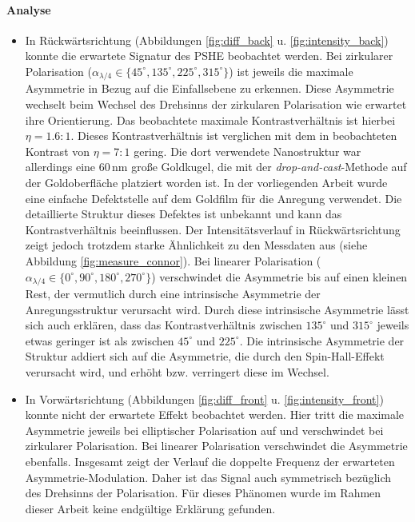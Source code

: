 \documentclass[a4paper, titlepage,  ngerman]{book}
\begin{document}
		\paragraph{Analyse}
		\begin{itemize}
			\item In Rückwärtsrichtung (Abbildungen \ref{fig:diff_back} u. \ref{fig:intensity_back}) konnte die erwartete Signatur des PSHE beobachtet werden. Bei zirkularer Polarisation ($\alpha_{\lambda/4} \in \{45^\circ, 135^\circ, 225^\circ, 315^\circ\}$) ist jeweils die maximale Asymmetrie in Bezug auf die Einfallsebene zu erkennen. Diese Asymmetrie wechselt beim Wechsel des Drehsinns der zirkularen Polarisation wie erwartet ihre Orientierung. Das beobachtete maximale Kontrastverhältnis ist hierbei $\eta = 1.6:1$. Dieses Kontrastverhältnis ist verglichen mit dem in \cite{OConnor.2014} beobachteten Kontrast von $\eta =7:1$ gering.  Die dort verwendete Nanostruktur war allerdings eine  $60\,\mathrm{nm}$ große Goldkugel, die mit der \textit{drop-and-cast}-Methode auf der Goldoberfläche platziert worden ist. In der vorliegenden Arbeit wurde eine einfache Defektstelle auf dem Goldfilm für die Anregung verwendet. Die detaillierte Struktur dieses Defektes ist unbekannt und kann das Kontrastverhältnis beeinflussen. Der Intensitätsverlauf in Rückwärtsrichtung zeigt jedoch trotzdem starke Ähnlichkeit zu den Messdaten aus \cite{OConnor.2014} (siehe Abbildung \ref{fig:measure_connor}). Bei linearer Polarisation ($\alpha_{\lambda/4} \in \{0^\circ, 90^\circ, 180^\circ, 270^\circ\}$) verschwindet die Asymmetrie bis auf einen kleinen Rest, der vermutlich durch eine intrinsische Asymmetrie der Anregungsstruktur verursacht wird. Durch diese intrinsische Asymmetrie lässt sich auch erklären, dass das Kontrastverhältnis zwischen $135^\circ$ und $ 315^\circ$ jeweils etwas geringer ist als zwischen $45^\circ$ und $225^\circ$.
			Die intrinsische Asymmetrie der Struktur addiert sich auf die Asymmetrie, die durch den Spin-Hall-Effekt verursacht wird, und erhöht bzw. verringert diese im Wechsel.
			\item In Vorwärtsrichtung (Abbildungen \ref{fig:diff_front} u. \ref{fig:intensity_front}) konnte nicht der erwartete Effekt beobachtet werden. Hier tritt die maximale Asymmetrie jeweils bei elliptischer Polarisation auf und verschwindet bei zirkularer Polarisation. Bei linearer Polarisation verschwindet die Asymmetrie ebenfalls. Insgesamt zeigt der Verlauf die doppelte Frequenz der erwarteten Asymmetrie-Modulation. Daher ist das Signal auch symmetrisch bezüglich des Drehsinns der Polarisation. Für dieses Phänomen wurde im Rahmen dieser Arbeit keine endgültige Erklärung gefunden.
			

\end{itemize}
\end{document}
